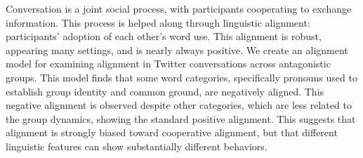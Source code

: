 Conversation is a joint social process, with participants cooperating to exchange information. This process is helped along through linguistic alignment: participants' adoption of each other's word use. This alignment is robust, appearing many settings, and is nearly always positive. We create an alignment model for examining alignment in Twitter conversations across antagonistic groups. This model finds that some word categories, specifically pronouns used to establish group identity and common ground, are negatively aligned. This negative alignment is observed despite other categories, which are less related to the group dynamics, showing the standard positive alignment.  This suggests that alignment is strongly biased toward cooperative alignment, but that different linguistic features can show substantially different behaviors.
